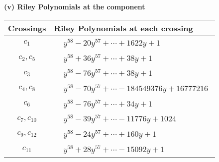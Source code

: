 \documentclass[1p]{elsarticle_modified}
\theoremstyle{definition}
\begin{document}
\newpage\renewcommand{\arraystretch}{1}
\flushleft \textbf{(v) Riley Polynomials at the component}\newline \\
\begin{tabular}{m{50pt}|m{274pt}}
Crossings & \hspace{64pt}Riley Polynomials at each crossing \\
\hline $$\begin{aligned}c_{1}\end{aligned}$$&$\begin{aligned}
&y^{58}-20 y^{57}+\cdots+1622 y+1
\end{aligned}$\\
\hline $$\begin{aligned}c_{2},c_{5}\end{aligned}$$&$\begin{aligned}
&y^{58}+36 y^{57}+\cdots+38 y+1
\end{aligned}$\\
\hline $$\begin{aligned}c_{3}\end{aligned}$$&$\begin{aligned}
&y^{58}-76 y^{57}+\cdots+38 y+1
\end{aligned}$\\
\hline $$\begin{aligned}c_{4},c_{8}\end{aligned}$$&$\begin{aligned}
&y^{58}-70 y^{57}+\cdots-184549376 y+16777216
\end{aligned}$\\
\hline $$\begin{aligned}c_{6}\end{aligned}$$&$\begin{aligned}
&y^{58}-76 y^{57}+\cdots+34 y+1
\end{aligned}$\\
\hline $$\begin{aligned}c_{7},c_{10}\end{aligned}$$&$\begin{aligned}
&y^{58}-39 y^{57}+\cdots-11776 y+1024
\end{aligned}$\\
\hline $$\begin{aligned}c_{9},c_{12}\end{aligned}$$&$\begin{aligned}
&y^{58}-24 y^{57}+\cdots+160 y+1
\end{aligned}$\\
\hline $$\begin{aligned}c_{11}\end{aligned}$$&$\begin{aligned}
&y^{58}+28 y^{57}+\cdots-15092 y+1
\end{aligned}$\\
\hline
\end{tabular}\\~\\
\end{document}
